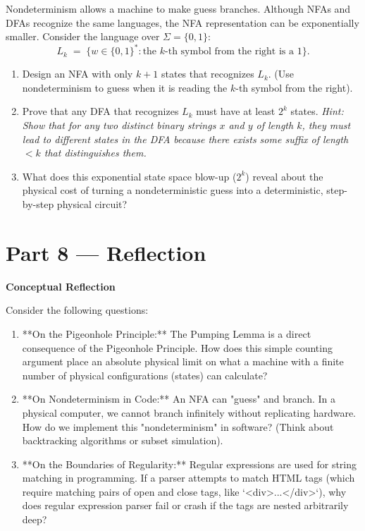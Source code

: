 \documentclass[12pt, a4paper]{book}
\begin{document}
\begin{deepbox}
\begin{enumerate}[label=\textbf{D\arabic*.}]
        Nondeterminism allows a machine to make guess branches. Although NFAs and DFAs recognize the same languages, the NFA representation can be exponentially smaller.
        Consider the language over $\Sigma = \{0, 1\}$:
        \[
          L_k \;=\; \{w \in \{0,1\}^* : \text{the } k\text{-th symbol from the right is a } 1\}.
        \]
        \begin{enumerate}[label=(\alph*)]
          \item Design an NFA with only $k+1$ states that recognizes $L_k$. (Use nondeterminism to guess when it is reading the $k$-th symbol from the right).
          \item Prove that any DFA that recognizes $L_k$ must have at least $2^k$ states. \textit{Hint: Show that for any two distinct binary strings $x$ and $y$ of length $k$, they must lead to different states in the DFA because there exists some suffix of length $< k$ that distinguishes them.}
          \item What does this exponential state space blow-up ($2^k$) reveal about the physical cost of turning a nondeterministic guess into a deterministic, step-by-step physical circuit?
        \end{enumerate}
\end{enumerate}
\end{deepbox}

\newpage

\section{Part 8 --- Reflection}

\begin{reflectionbox}
\textbf{Conceptual Reflection}

Consider the following questions:
\begin{enumerate}
  \item **On the Pigeonhole Principle:** The Pumping Lemma is a direct consequence of the Pigeonhole Principle. How does this simple counting argument place an absolute physical limit on what a machine with a finite number of physical configurations (states) can calculate?
  \item **On Nondeterminism in Code:** An NFA can "guess" and branch. In a physical computer, we cannot branch infinitely without replicating hardware. How do we implement this "nondeterminism" in software? (Think about backtracking algorithms or subset simulation).
  \item **On the Boundaries of Regularity:** Regular expressions are used for string matching in programming. If a parser attempts to match HTML tags (which require matching pairs of open and close tags, like `<div>...</div>`), why does regular expression parser fail or crash if the tags are nested arbitrarily deep?
\end{enumerate}
\end{reflectionbox}
\end{document}
